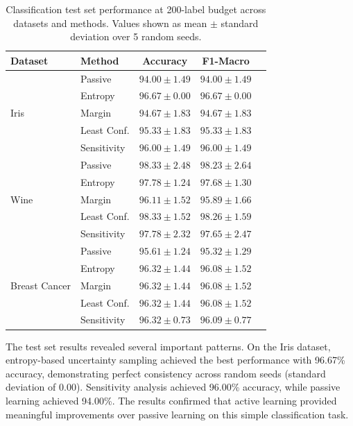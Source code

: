\documentclass[conference]{IEEEtran}
\begin{document}
\begin{table}[t]
\centering
\caption{Classification test set performance at 200-label budget across datasets and methods. Values shown as mean $\pm$ standard deviation over 5 random seeds.}
\label{tab:cls-test-results}
\begin{tabular}{llccc}
\toprule
Dataset & Method & Accuracy & F1-Macro \\
\midrule
\multirow{5}{*}{Iris} & Passive & $94.00 \pm 1.49$ & $94.00 \pm 1.49$ \\
 & Entropy & $\mathbf{96.67 \pm 0.00}$ & $\mathbf{96.67 \pm 0.00}$ \\
 & Margin & $94.67 \pm 1.83$ & $94.67 \pm 1.83$ \\
 & Least Conf. & $95.33 \pm 1.83$ & $95.33 \pm 1.83$ \\
 & Sensitivity & $96.00 \pm 1.49$ & $96.00 \pm 1.49$ \\
\midrule
\multirow{5}{*}{Wine} & Passive & $98.33 \pm 2.48$ & $98.23 \pm 2.64$ \\
 & Entropy & $\mathbf{97.78 \pm 1.24}$ & $\mathbf{97.68 \pm 1.30}$ \\
 & Margin & $96.11 \pm 1.52$ & $95.89 \pm 1.66$ \\
 & Least Conf. & $\mathbf{98.33 \pm 1.52}$ & $\mathbf{98.26 \pm 1.59}$ \\
 & Sensitivity & $97.78 \pm 2.32$ & $97.65 \pm 2.47$ \\
\midrule
\multirow{5}{*}{Breast Cancer} & Passive & $95.61 \pm 1.24$ & $95.32 \pm 1.29$ \\
 & Entropy & $\mathbf{96.32 \pm 1.44}$ & $\mathbf{96.08 \pm 1.52}$ \\
 & Margin & $\mathbf{96.32 \pm 1.44}$ & $\mathbf{96.08 \pm 1.52}$ \\
 & Least Conf. & $\mathbf{96.32 \pm 1.44}$ & $\mathbf{96.08 \pm 1.52}$ \\
 & Sensitivity & $\mathbf{96.32 \pm 0.73}$ & $\mathbf{96.09 \pm 0.77}$ \\
\bottomrule
\end{tabular}
\end{table}

The test set results revealed several important patterns. On the Iris dataset, entropy-based uncertainty sampling achieved the best performance with 96.67\% accuracy, demonstrating perfect consistency across random seeds (standard deviation of 0.00). Sensitivity analysis achieved 96.00\% accuracy, while passive learning achieved 94.00\%. The results confirmed that active learning provided meaningful improvements over passive learning on this simple classification task.
\end{document}
